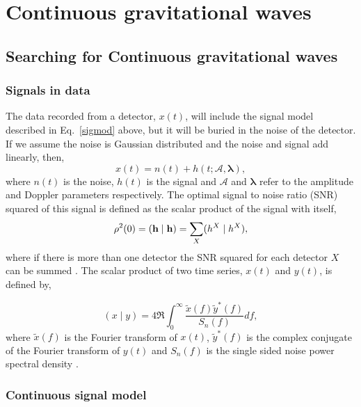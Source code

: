 \chapter{Continuous gravitational waves}


\section{\label{intro:search}Searching for Continuous gravitational waves}

\subsection{\label{intro:search:signals} Signals in data}

The data recorded from a detector, $x(t)$, will include the signal model described in Eq.~\ref{sigmod} above, but it will be buried in the noise of the detector. 
If we assume the noise is Gaussian distributed and the noise and signal add linearly, then,  
\begin{equation}
\label{signalinnoise}
x(t) = n(t) + h(t; \mathcal{A},{\boldsymbol \lambda}) ,
\end{equation}
where $n(t)$ is the noise, $h(t)$ is the signal and $\mathcal{A}$ and ${\boldsymbol \lambda}$ refer to the amplitude and Doppler parameters respectively. 
The optimal signal to noise ratio (SNR) squared of this signal is defined as the scalar product of the signal with itself,
\begin{equation}
\rho^2(0) = ({\bf h} \mid {\bf h}) = \sum_X(h^X \mid h^X),
\end{equation}
where if there is more than one detector the SNR squared for each detector $X$ can be summed \citep{Prix2007}. 
The scalar product of two time series, $x(t)$ and $y(t)$, is defined by,

\begin{equation}
\label{intro:search:signals:scalarproduct}
(x \mid y) = 4 \Re \int_{0}^{\infty} \frac{\tilde{x}(f)\tilde{y}^{*}(f)}{S_n(f)}df,
\end{equation}
where $\tilde{x}(f)$ is the Fourier transform of $x(t)$, $\tilde{y}^{*}(f)$ is the complex conjugate of the Fourier transform of $y(t)$ and $S_n(f)$ is the single sided noise power spectral density \citep{Prix2007}.


\subsection{\label{intro:search:model}Continuous signal model}

